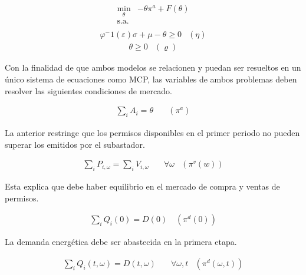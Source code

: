 \begin{equation}
\begin{array}{rrclcl}
    \displaystyle \min_{\theta} &-\theta \pi^a + F(\theta) \\\textrm{s.a.} \label{eq:sub}\\
\end{array}
\end{equation}
\begin{equation}
\begin{array}{cl}
    \varphi^-1 (\varepsilon )\sigma + \mu - \theta \geq 0 & (\eta) \label{res:sub1}
\end{array}
\end{equation}
\begin{equation}
\begin{array}{cl}
   \theta \geq 0 & (\varrho)\label{res:sub2}
\end{array}
\end{equation}

Con la finalidad de que ambos modelos se relacionen y puedan ser resueltos en un único sistema de ecuaciones como MCP, las variables de ambos problemas deben resolver las siguientes condiciones de mercado.

\begin{align}
   \sum_{i}A_i = \theta  &\quad (\pi^a)\label{rescom:1}
\end{align}

La anterior restringe que los permisos disponibles en el primer periodo no pueden superar los emitidos por el subastador.

\begin{align}
    \sum_{i}P_{i,\omega} = \sum_{i}V_{i,\omega} \quad& \forall \omega &(\pi^v (w))\label{rescom:2}
\end{align}
    


Esta explica que debe haber equilibrio en el mercado de compra y ventas de permisos.

\begin{align}
  \sum_{i}Q_i(0) = D(0) \quad (\pi^d (0))\label{rescom:3}  
\end{align}


La demanda energética debe ser abastecida en la primera etapa.

\begin{align}
    \sum_{i}Q_i(t,\omega) = D(t,\omega) \quad& \forall  \omega,t & (\pi^d (\omega,t))\label{rescom:4}
\end{align}

